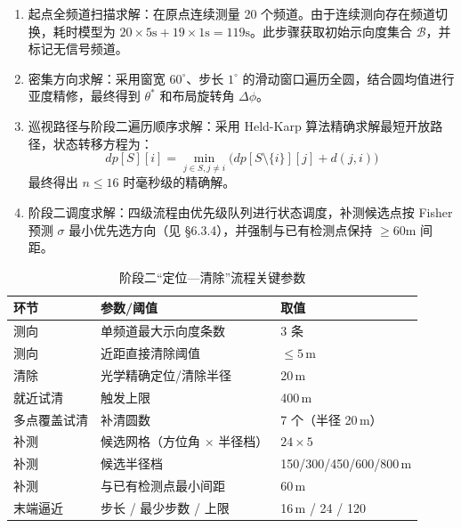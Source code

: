 \documentclass[UTF8, zihao=5,AutoFakeBold=2]{ctexart}
\begin{document}
\begin{enumerate}
    \item 起点全频道扫描求解：在原点连续测量 20 个频道。由于连续测向存在频道切换，耗时模型为 \(20 \times 5\text{s} + 19 \times 1\text{s} = 119\text{s}\)。此步骤获取初始示向度集合 \(\mathcal{B}\)，并标记无信号频道。
    \item 密集方向求解：采用窗宽 \(60^{\circ}\)、步长 \(1^{\circ}\) 的滑动窗口遍历全圆，结合圆均值进行亚度精修，最终得到 \(\theta^*\) 和布局旋转角 \(\Delta\phi\)。
    \item 巡视路径与阶段二遍历顺序求解：采用 Held-Karp 算法精确求解最短开放路径，状态转移方程为：
    \begin{equation}
    dp[S][i] = \min_{j \in S, j \neq i} \bigl( dp[S \setminus \{i\}][j] + d(j,i) \bigr)
    \end{equation}
    最终得出 \(n \leq 16\) 时毫秒级的精确解。
    \item 阶段二调度求解：四级流程由优先级队列进行状态调度，补测候选点按 Fisher 预测 \(\sigma\) 最小优先选方向（见 \S6.3.4），并强制与已有检测点保持 \(\geq 60\text{m}\) 间距。
\end{enumerate}

\begin{table}[H]
    \centering
    \caption{阶段二“定位—清除”流程关键参数}
    \label{tab:t3-pipeline}
    \begin{tabular}{lll}
        \toprule
        环节 & 参数/阈值 & 取值 \\
        \midrule
        测向 & 单频道最大示向度条数 & 3 条 \\
        测向 & 近距直接清除阈值 & \(\le 5\)\,m \\
        清除 & 光学精确定位/清除半径 & 20\,m \\
        就近试清 & 触发上限 & 400\,m \\
        多点覆盖试清 & 补清圆数 & 7 个（半径 20\,m） \\
        补测 & 候选网格（方位角 \(\times\) 半径档） & \(24\times 5\) \\
        补测 & 候选半径档 & 150/300/450/600/800\,m \\
    补测 & 与已有检测点最小间距 & 60\,m \\
    末端逼近 & 步长 / 最少步数 / 上限 & 16\,m / 24 / 120 \\
    \bottomrule
    \end{tabular}
\end{table}
\end{document}
